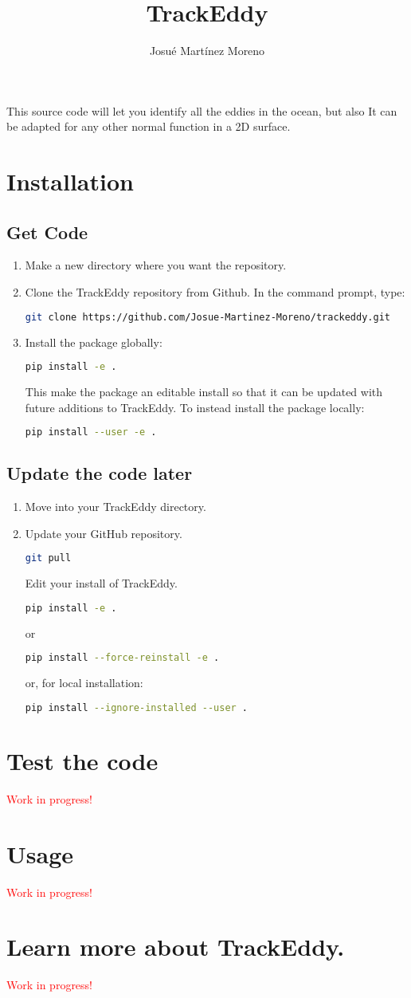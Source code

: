 \documentclass[paper=a4, fontsize=12pt]{article}
\title{TrackEddy}
\author{Josu\'e Mart\'inez Moreno }
\begin{document}
\maketitle
This source code will let you identify all the eddies in the ocean, but also It can be adapted for any other normal function in a 2D surface.
\section{Installation}
\subsection{Get Code}
\begin{enumerate}
\item Make a new directory where you want the repository.
\item Clone the TrackEddy repository from Github. In the command prompt, type:
\begin{lstlisting}[language=bash,style=bash]
 git clone https://github.com/Josue-Martinez-Moreno/trackeddy.git
\end{lstlisting}
\item Install the package globally: 
\begin{lstlisting}[language=bash,style=bash]
pip install -e .
\end{lstlisting}
This make the package an editable install so that it can be updated with future additions to TrackEddy. To instead install the package locally:
\begin{lstlisting}[language=bash,style=bash]
pip install --user -e .
\end{lstlisting}
\end{enumerate}
\subsection{Update the code later}
\begin{enumerate}
\item Move into your TrackEddy directory.
\item Update your GitHub repository. 
\begin{lstlisting}[language=bash,style=bash]
git pull
\end{lstlisting}
Edit your install of TrackEddy.
\begin{lstlisting}[language=bash,style=bash]
pip install -e .
\end{lstlisting}
or 
\begin{lstlisting}[language=bash,style=bash]
pip install --force-reinstall -e . 
\end{lstlisting}
or, for local installation: 
\begin{lstlisting}[language=bash,style=bash]
pip install --ignore-installed --user .
\end{lstlisting}
\end{enumerate}
\section{Test the code}
\textcolor{red}{Work in progress!}
\section{Usage}
\textcolor{red}{Work in progress!}
\section{Learn more about TrackEddy.}
\textcolor{red}{Work in progress!}
\end{document}
